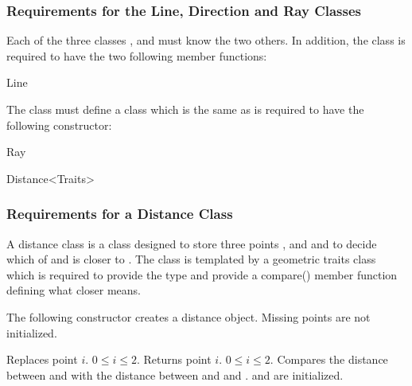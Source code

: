 \subsubsection{Requirements for the Line, Direction and Ray Classes}

Each of the three classes ,  and 
  must know the two others.
In addition, the  class is required to have the two
following member functions:
\begin{ccClass}{Line}

\ccGlue
{}
\end{ccClass}
The  class must define a  class which is the same
as  
is required to have the following constructor:

\begin{ccClass}{Ray}
\end{ccClass}



\begin{ccClassTemplate} {Distance<Traits>}
\subsubsection{Requirements for a Distance Class}

A distance  class is a class designed to store three points
,  and  and to decide which of 
and  is closer to . 
The class is templated by a geometric traits class 
which is required to provide the  type
and provide a compare() member function 
defining what closer means.

\ccTypes
{}

\ccCreation

The following constructor creates a distance object. Missing points are not initialized.

\ccOperations
{}

{Replaces point $i$. \ccPrecond $0\leq i \leq 2$.}
\ccGlue
{}
{Returns point $i$. \ccPrecond $0\leq i \leq 2$.}
{Compares the distance between  and 
 with the distance between  and and .
 \ccPrecond {} and  are initialized.}

\end{ccClassTemplate}



